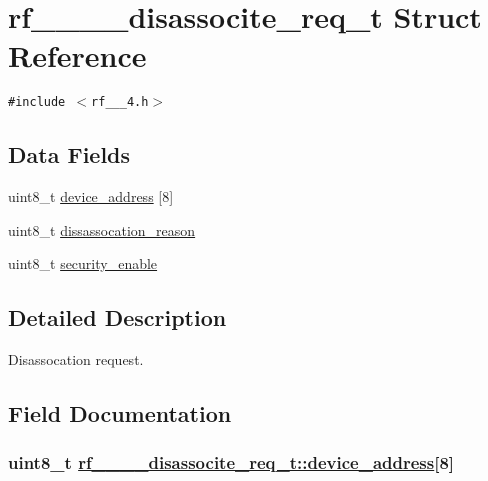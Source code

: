\hypertarget{structrf__802__15__4__disassocite__req__t}{
\section{rf\_\_\_\_\-disassocite\_\-req\_\-t Struct Reference}
\label{structrf__802__15__4__disassocite__req__t}
}
{\tt \#include $<$rf\_\_\_\-4.h$>$}

\subsection*{Data Fields}
\begin{CompactItemize}
\item 
uint8\_\-t \hyperlink{structrf__802__15__4__disassocite__req__t_ecb127b39cd57d94639ad1450f8154ee}{device\_\-address} \mbox{[}8\mbox{]}
\item 
uint8\_\-t \hyperlink{structrf__802__15__4__disassocite__req__t_310f7da6cba70895a4b81fcb17d95e19}{dissassocation\_\-reason}
\item 
uint8\_\-t \hyperlink{structrf__802__15__4__disassocite__req__t_4f897e2cb21faf5dc3fdf4a6853cc57c}{security\_\-enable}
\end{CompactItemize}


\subsection{Detailed Description}
Disassocation request. 



\subsection{Field Documentation}
\hypertarget{structrf__802__15__4__disassocite__req__t_ecb127b39cd57d94639ad1450f8154ee}{
\subsubsection[device\_\-address]{\setlength{\rightskip}{0pt plus 5cm}uint8\_\-t \hyperlink{structrf__802__15__4__disassocite__req__t_ecb127b39cd57d94639ad1450f8154ee}{rf\_\_\_\_\-disassocite\_\-req\_\-t::device\_\-address}\mbox{[}8\mbox{]}}}
\label{structrf__802__15__4__disassocite__req__t_ecb127b39cd57d94639ad1450f8154ee}


